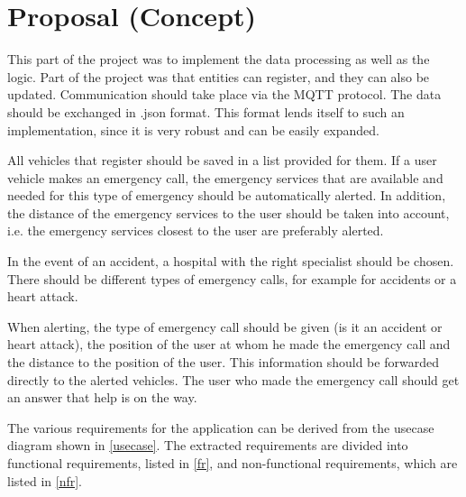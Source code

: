 \section{Proposal (Concept)}
\label{sec:3}

This part of the project was to implement the data processing as well as the logic. Part of the project was that entities can register, and they can also be updated. Communication should take place via the MQTT protocol. The data should be exchanged in .json format. This format lends itself to such an implementation, since it is very robust and can be easily expanded. 

All vehicles that register should be saved in a list provided for them. If a user vehicle makes an emergency call, the emergency services that are available and needed for this type of emergency should be automatically alerted. In addition, the distance of the emergency services to the user should be taken into account, i.e. the emergency services closest to the user are preferably alerted. 

In the event of an accident, a hospital with the right specialist should be chosen. There should be different types of emergency calls, for example for accidents or a heart attack. 

When alerting, the type of emergency call should be given (is it an accident or heart attack), the position of the user at whom he made the emergency call and the distance to the position of the user. This information should be forwarded directly to the alerted vehicles. The user who made the emergency call should get an answer that help is on the way.



The various requirements for the application can be derived from the usecase diagram shown in \ref{usecase}. The extracted requirements are divided into functional requirements, listed in \ref{fr}, and non-functional requirements, which are listed in \ref{nfr}.

